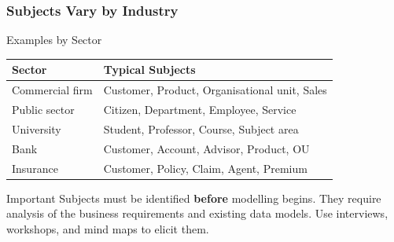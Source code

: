 \begin{frame}
  \frametitle{Subjects Vary by Industry}

  \begin{block}{Examples by Sector}
    \begin{tabularx}{\linewidth}{@{}l X@{}}
      \toprule
      \textbf{Sector}    & \textbf{Typical Subjects} \\
      \midrule
      Commercial firm    & Customer, Product, Organisational unit, Sales \\
      Public sector      & Citizen, Department, Employee, Service \\
      University         & Student, Professor, Course, Subject area \\
      Bank               & Customer, Account, Advisor, Product, OU \\
      Insurance          & Customer, Policy, Claim, Agent, Premium \\
      \bottomrule
    \end{tabularx}
  \end{block}

  \begin{alertblock}{Important}
    Subjects must be identified \textbf{before} modelling begins.
    They require analysis of the business requirements and existing data models.
    Use interviews, workshops, and mind maps to elicit them.
  \end{alertblock}
\end{frame}

